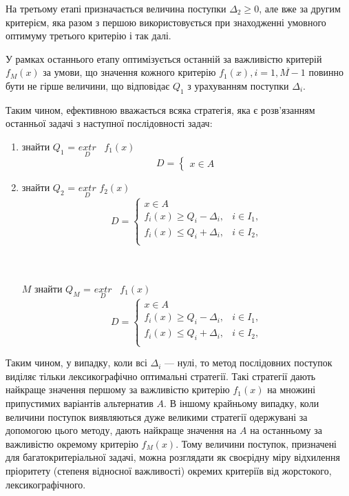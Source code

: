 На третьому етапі призначається величина поступки $\Delta_2 \geq 0$, але вже за другим критерієм, яка разом з першою використовується при знаходженні умовного оптимуму третього критерію і так далі. 

У рамках останнього етапу оптимізується останній за важливістю критерій $f_M(x)$ за умови, що значення кожного критерію $f_1(x), i=\overline{1, M-1}$ повинно бути не гірше величини, що відповідає $Q_1$ з урахуванням поступки $\Delta_i$.

Таким чином, ефективною вважається 	всяка стратегія, яка є розв'язанням останньої задачі з наступної послідовності задач:
\begin{enumerate}[label=\arabic*)]
	\item знайти  $Q_1$ = $\underset{D}{extr}$ $\,$ $f_1(x)$
	\begin{equation}
		D = \begin{cases} 
			x \in A 
		\end{cases} 
	\end{equation}
	\item знайти $Q_2$ = $\underset{D}{extr}$ $f_2(x)$
	\begin{equation}
		D = \begin{cases} 
			x \in A \\
			f_i(x) \geq Q_i - \Delta_i, & i \in I_1, \\
			f_i(x) \leq Q_i + \Delta_i, & i \in I_2, \\  
		\end{cases}
	\end{equation} \\

	\noindent\dotfill \\
	
	\item[$M$] знайти $Q_M$ = $\underset{D}{extr}$ $\,$ $f_1(x)$ \\
	\begin{equation}
		D = \begin{cases}
			x \in A \\
			f_i(x) \geq Q_i - \Delta_i, & i \in I_1, \\
			f_i(x) \leq Q_i + \Delta_i, & i \in I_2, \\  
		\end{cases}
	\end{equation}
\end{enumerate}

Таким чином, у випадку, коли всі $\Delta_i$ --- нулі, то метод послідовних поступок виділяє тільки лексикографічно оптимальні стратегії. 
Такі стратегії дають найкраще значення першому за важливістю критерію $f_1(x)$ на множині припустимих варіантів альтернатив $A$. 
В іншому крайньому випадку, коли величини поступок виявляються дуже великими стратегії одержувані за допомогою цього методу, дають найкраще значення на $A$ на останньому за важливістю окремому критерію $f_M(x)$. 
Тому величини поступок, призначені для багатокритеріальної задачі, можна розглядати як 	своєрідну міру відхилення пріоритету (степеня відносної важливості) окремих критеріїв від жорстокого, лексикографічного.

